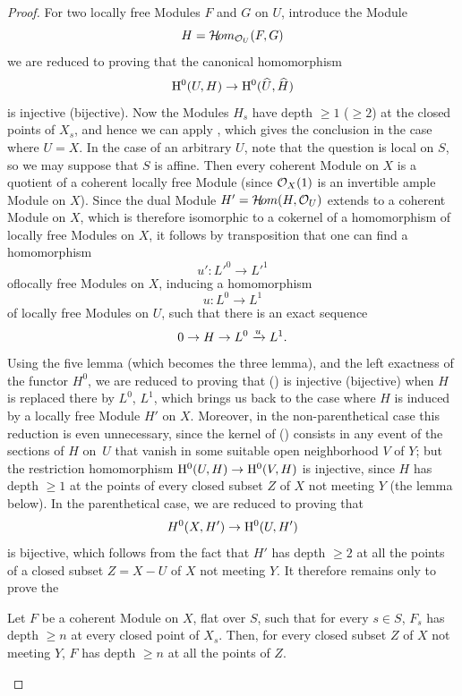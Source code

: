 \begin{proof}
For two locally free Modules $F$ and $G$ on $U$, introduce the Module
\[
H=\mathcal H\!om_{\mathcal O_U}(F, G)
\]
we are reduced to proving that the canonical homomorphism
\steco
\begin{equation} \label{eq:XII.15} {}\mathrm H^0(U, H) \to \mathrm H^0(\widehat{U}, \widehat{H})
\end{equation}
is injective (\resp bijective). Now the Modules $H_s$ have depth $\geq 1$ (\resp $\geq 2$) at the closed points of $X_s$, and hence we can apply , which gives the conclusion  in the case where $U=X$. In the case of an arbitrary $U$, note that the question is local on $S$, so we may suppose that $S$ is affine. Then every coherent Module on $X$ is a quotient of a coherent locally free Module (since $\mathcal O_X(1)$ is an invertible  ample Module on $X$). Since the dual Module $H'=\mathcal H\!om(H, \mathcal O_U)$ extends to a coherent Module on $X$, which is therefore isomorphic to a cokernel of a homomorphism of locally free Modules on $X$, it follows by transposition that one can find a homomorphism
\[
u':{L'}^0 \to {L'}^1
\]
of\pageoriginale locally free Modules on $X$, inducing a homomorphism
\[
u:L^0 \to L^1
\]
of locally free Modules on $U$, such that there is an exact sequence
\[
0\to H \to L^0 \xrightarrow{u} L^1.
\]
Using the five lemma (which becomes the three lemma), and the left exactness of the functor $H^0$, we are reduced to proving that () is injective (\resp bijective) when $H$ is replaced there by $L^0$, $L^1$, which brings us back to the case where $H$ is induced by a locally free Module $H'$ on $X$. Moreover, in the non-parenthetical case this reduction is even unnecessary, since the kernel of () consists in any event of the sections of $H$ on~$U$ that vanish in some suitable open neighborhood $V$ of $Y$; but the restriction homomorphism $\mathrm H^0(U, H)\to\mathrm H^0(V, H)$ is injective, since $H$ has depth $\geq 1$ at the points of every closed subset $Z$ of $X$ not meeting $Y$ (\cf the lemma below). In the parenthetical case, we are reduced to proving that
\[
H^0(X, H')\to\mathrm H^0(U, H')
\]
is bijective, which follows from the fact that $H'$ has depth $\geq 2$ at all the points of a closed subset $Z=X- U$ of $X$ not meeting $Y$. It therefore remains only to prove the

\begin{lemme} \label{XII.2.5} Let $F$ be a coherent Module on $X$, flat over $S$, such that for every $s\in S$, $F_s$ has depth $\geq n$ at every closed point of $X_s$. Then, for every closed subset $Z$ of $X$ not meeting $Y$, $F$ has depth $\geq n$ at all the points of $Z$.
\end{lemme}


\end{proof}
